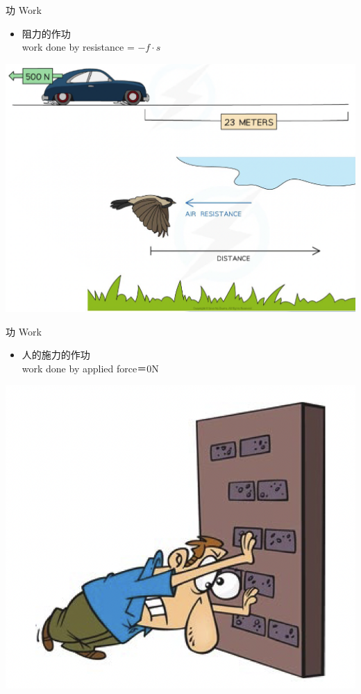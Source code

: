 \documentclass[beamer=true]{standalone}
\begin{document}
\begin{frame}{功 Work}
    \begin{itemize}
        \item 阻力的作功\\work done by resistance = $-f\cdot s$
    \end{itemize}

    {\par\centering
    \includegraphics[width=.8\textwidth]{assets/f84b7953.png}
    \par}
\end{frame}
\begin{frame}{功 Work}
    \begin{itemize}
        \item 人的施力的作功\\work done by applied force＝0N
    \end{itemize}
    {\par\centering
    \includegraphics[width=.6\textwidth]{assets/5dba0df5.png}
    \par}
\end{frame}
\end{document}
